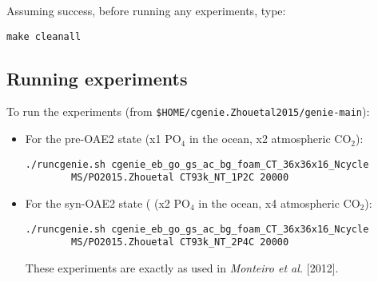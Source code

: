\documentclass[10pt,twoside]{article}
\begin{document}
\begin{compactenum}
Assuming success, before running any experiments, type:
\vspace{-5pt}\begin{verbatim}
make cleanall
\end{verbatim}\vspace{-5pt}

\end{compactenum}


\subsection{Running experiments}

To run the experiments (from \texttt{\$HOME/cgenie.Zhouetal2015/genie-main}):

\begin{itemize}

\item For the pre-OAE2 state (x1 PO\(_{4}\) in the ocean, x2 atmospheric CO\(_{2}\)):

\vspace{-5pt}\begin{verbatim}
./runcgenie.sh cgenie_eb_go_gs_ac_bg_foam_CT_36x36x16_Ncycle 
        MS/PO2015.Zhouetal CT93k_NT_1P2C 20000
\end{verbatim}\vspace{-5pt}

\item For the syn-OAE2 state ( (x2 PO\(_{4}\) in the ocean, x4 atmospheric CO\(_{2}\)):

\vspace{-5pt}\begin{verbatim}
./runcgenie.sh cgenie_eb_go_gs_ac_bg_foam_CT_36x36x16_Ncycle
        MS/PO2015.Zhouetal CT93k_NT_2P4C 20000
\end{verbatim}\vspace{-5pt}

These experiments are exactly as used in \textit{Monteiro et al.} [2012].

\end{itemize}

\end{document}
